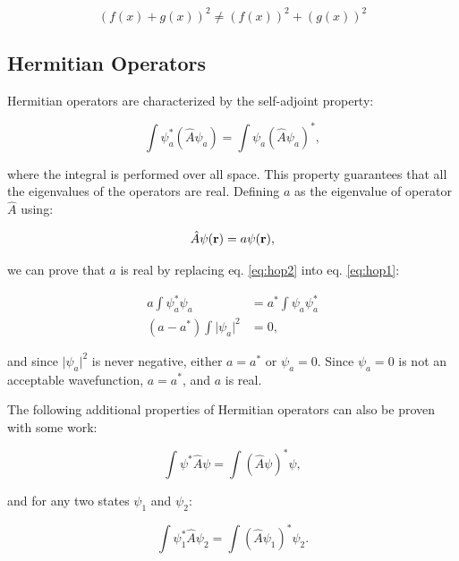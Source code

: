 \documentclass[
  9pt,
]{extbook}
\theoremstyle{definition}
\theoremstyle{definition}
\theoremstyle{definition}
\theoremstyle{remark}
\begin{document}
\begin{equation}
(f(x) + g(x))^2 \neq (f(x))^2 + (g(x))^2
\label{eq:linop3}
\end{equation}

\hypertarget{hermitian-operators}{%
\subsection{Hermitian Operators}\label{hermitian-operators}}

Hermitian operators are characterized by the self-adjoint property:

\begin{equation}
\int \psi_a^{*} (\hat{A} \psi_a) =  \int \psi_a (\hat{A} \psi_a)^{*},
\label{eq:hop1}
\end{equation}

where the integral is performed over all space. This property guarantees that all the eigenvalues of the operators are real. Defining \(a\) as the eigenvalue of operator \(\hat{A}\) using:

\begin{equation}
\hat{A} \psi({\bf r}) = a \psi({\bf r}),
\label{eq:hop2}
\end{equation}

we can prove that \(a\) is real by replacing eq. \eqref{eq:hop2} into eq. \eqref{eq:hop1}:

\begin{equation}
\begin{aligned}
a \int \psi_a^{*} \psi_a &= a^{*} \int \psi_a \psi_a^{*} \\
(a - a^{*}) \int \vert\psi_a\vert^2 &= 0,
\end{aligned}
\label{eq:hop4}
\end{equation}

and since \(\vert\psi_a\vert^2\) is never negative, either \(a = a^{*}\) or \(\psi_a = 0\). Since \(\psi_a = 0\) is not an acceptable wavefunction, \(a = a^{*}\), and \(a\) is real.

The following additional properties of Hermitian operators can also be proven with some work:

\begin{equation}
\int \psi^{*}\hat{A} \psi =
\int (\hat{A} \psi)^{*} \psi,
\label{eq:hop2b}
\end{equation}

and for any two states \(\psi_1\) and \(\psi_2\):

\begin{equation}
\int \psi_1^{*} \hat{A} \psi_2 =
\int (\hat{A} \psi_1)^{*} \psi_2.
\label{eq:hop3}
\end{equation}
\end{document}
